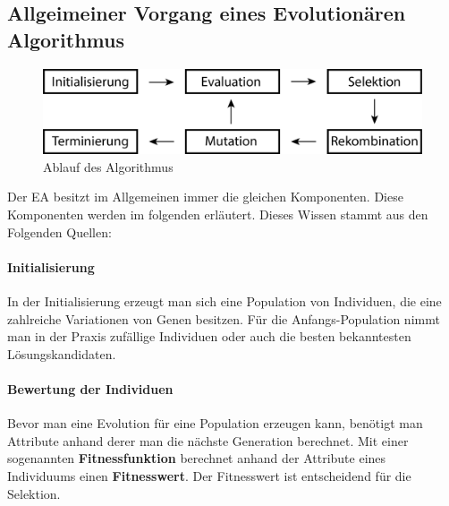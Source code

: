 \subsection{Allgeimeiner Vorgang eines Evolution{\"a}ren Algorithmus}
\begin{figure}
	\centering
    \includegraphics[width=\textwidth]{pics/algoSchritte.png}
    \caption{Ablauf des Algorithmus}
    \label{fig:algoSchritte}
\end{figure}
Der EA besitzt im Allgemeinen immer die gleichen Komponenten. Diese Komponenten werden im folgenden erl{\"a}utert. Dieses Wissen stammt aus den Folgenden Quellen: \cite{shiffman2012nature, flickevolutionare, weicker2015evolutionare}

\paragraph*{Initialisierung}
In der Initialisierung erzeugt man sich eine Population von Individuen, die eine zahlreiche Variationen von Genen besitzen. F{\"u}r die Anfangs-Population nimmt man in der Praxis zuf{\"a}llige Individuen oder auch die besten bekanntesten L{\"o}sungskandidaten.

\paragraph*{Bewertung der Individuen}
Bevor man eine Evolution f{\"u}r eine Population erzeugen kann, ben{\"o}tigt man Attribute anhand derer man die n{\"a}chste Generation berechnet. Mit einer sogenannten \textbf{Fitnessfunktion} berechnet anhand der Attribute eines Individuums einen \textbf{Fitnesswert}. Der Fitnesswert ist entscheidend f{\"u}r die Selektion.



